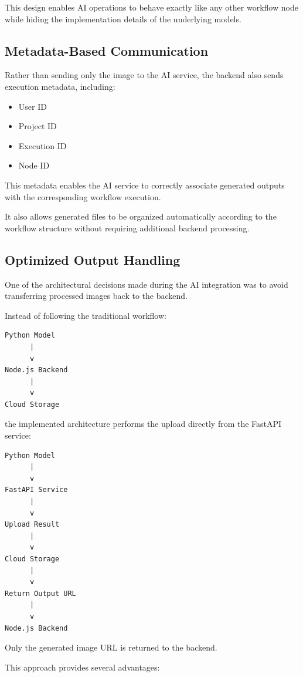 This design enables AI operations to behave exactly like any other workflow node while hiding the implementation details of the underlying models.


\subsection{Metadata-Based Communication}

Rather than sending only the image to the AI service, the backend also sends execution metadata, including:

\begin{itemize}
    \item User ID
    \item Project ID
    \item Execution ID
    \item Node ID
\end{itemize}

This metadata enables the AI service to correctly associate generated outputs with the corresponding workflow execution.

It also allows generated files to be organized automatically according to the workflow structure without requiring additional backend processing.


\subsection{Optimized Output Handling}

One of the architectural decisions made during the AI integration was to avoid transferring processed images back to the backend.

Instead of following the traditional workflow:

\begin{verbatim}
Python Model
      |
      v
Node.js Backend
      |
      v
Cloud Storage
\end{verbatim}

the implemented architecture performs the upload directly from the FastAPI service:

\begin{verbatim}
Python Model
      |
      v
FastAPI Service
      |
      v
Upload Result
      |
      v
Cloud Storage
      |
      v
Return Output URL
      |
      v
Node.js Backend
\end{verbatim}

Only the generated image URL is returned to the backend.

This approach provides several advantages:

